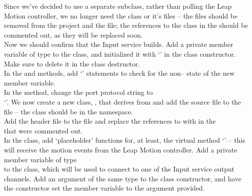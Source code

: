 Since we've decided to use a separate  subclass, rather than
polling the Leap Motion controller, we no longer need the 
class or it's files -- the files should be removed from the project and the
 file; the references to the
 class in the  should be
commented out, as they will be replaced soon.\\

Now we should confirm that the Input service builds.
\tertiaryEnd{}
Add a private member variable of type  to the
 class, and initialized it with
`' in the class constructor.
Make sure to delete it in the class destructor.\\

In the  and
 methods, add `' statements to
check for the non-- state of the new member variable.\\

In the  method, change the
port protocol string to\\
`'.
\tertiaryEnd{}
We now create a new  class, , that derives
from  and add the source file to the
 file -- the class should be in the
 namespace.\\

Add the header file  to the file
 and replace the references to
 with  in the\\
 that were commented out.\\

In the  class, add `placeholder' functions for, at least,
the virtual method `' -- this will receive the motion events from the
Leap Motion controller.
Add a private member variable of type\\
 to the class, which will be used to connect to one of
the Input service output channels.
Add an argument of the same type to the class constructor, and have the constructor set
the member variable to the argument provided.\\

